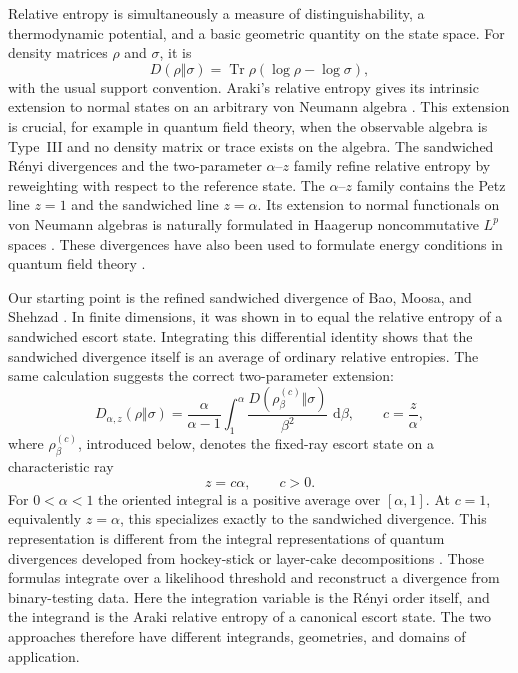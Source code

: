 \documentclass[12pt]{article}
\numberwithin{equation}{section}
\theoremstyle{definition}
\theoremstyle{remark}
\newcommand{\dd}{\,\mathrm d}
\newcommand{\?}{\overset{?}{=}}
\DeclareMathOperator{\Tr}{Tr}
\begin{document}
Relative entropy is simultaneously a measure of distinguishability, a
thermodynamic potential, and a basic geometric quantity on the state
space.  For density matrices $\rho$ and $\sigma$, it is
\begin{equation}
  D(\rho\Vert\sigma)
  =\Tr\rho(\log\rho-\log\sigma),
\end{equation}
with the usual support convention.  Araki's relative entropy gives its
intrinsic extension to normal states on an arbitrary von Neumann algebra
\cite{Araki:1976zv}.  This extension is crucial, for example in quantum field theory, when the observable algebra is Type~III and no density matrix or trace exists
on the algebra. The sandwiched R\'enyi divergences
\cite{Muller-Lennert:2013liu,Wilde:2013bdg} and the two-parameter
$\alpha$--$z$ family \cite{Audenaert:2015npv} refine relative entropy by reweighting with respect to the reference state.  The
$\alpha$--$z$ family contains the Petz line $z=1$ and the sandwiched line
$z=\alpha$.  Its extension to normal functionals on von Neumann algebras
is naturally formulated in Haagerup noncommutative $L^p$ spaces
\cite{Kato:2023aro,Kato:2023hlj,Hiai:2024qve}. These divergences have also been used to formulate energy conditions in quantum field theory \cite{Lashkari:2018nsl,Moosa:2020jwt,Roy:2022yzm,Kibe:2026wsg,Kibe:2026bcn}.

Our starting point is the refined sandwiched divergence of
Bao, Moosa, and Shehzad \cite{Bao:2019aol}.  In finite dimensions,
it was shown in \cite{Bao:2019aol} to equal the relative entropy
of a sandwiched escort state.  Integrating this differential identity
shows that the sandwiched divergence itself is an average of ordinary
relative entropies.  The same calculation suggests the correct
two-parameter extension: 
\begin{equation}
  D_{\alpha,z}(\rho\Vert\sigma)
  =\frac{\alpha}{\alpha-1}
   \int_1^\alpha
   \frac{D(\rho_{\beta}^{(c)}\Vert\sigma)}{\beta^2}\,\dd\beta,
  \qquad c=\frac z\alpha,
  \label{eq:intro-fd-formula}
\end{equation}
where $\rho_{\beta}^{(c)}$, introduced below, denotes the fixed-ray escort state 
on a characteristic ray
\begin{equation}
  z=c\alpha,\qquad c>0.
  \label{eq:intro-ray}
\end{equation}
For $0<\alpha<1$ the oriented integral is a positive average over
$[\alpha,1]$.  At $c=1$, equivalently $z=\alpha$, this specializes
exactly to the sandwiched divergence. This representation is different from the integral
representations of quantum divergences developed from hockey-stick or
layer-cake decompositions \cite{Hirche:2023caq,Liu:2025npj}.
Those formulas integrate over a likelihood threshold and reconstruct a
divergence from binary-testing data.  Here the integration variable is the
R\'enyi order itself, and the integrand is the Araki relative entropy of a
canonical escort state.  The two approaches therefore have different
integrands, geometries, and domains of application.
\end{document}
